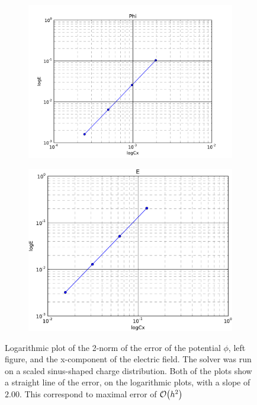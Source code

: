\begin{figure}
    \centering
    \begin{subfigure}[b]{0.49\textwidth}
        \includegraphics[width = \textwidth]{figures/verification/errorScaling/errorloglog}
    \end{subfigure}
    \begin{subfigure}[b]{0.49\textwidth}
        \includegraphics[width = \textwidth]{figures/verification/errorScaling/errorEloglog}
    \end{subfigure}
    \caption{Logarithmic plot of the 2-norm of the error of the potential \(\phi\), left figure, and the
    x-component of the electric field. The solver was run on a scaled sinus-shaped charge distribution.
    Both of the plots show a straight line of the error, on the logarithmic plots, with a slope
    of \(2.00\). This correspond to maximal error of \(\order{h^2}\)}
    \label{fig:errorScaling}
\end{figure}
